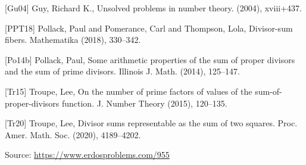 \documentclass{article}
\begin{document}
 [Gu04] Guy, Richard K., Unsolved problems in number theory. (2004), xviii+437.
 
 [PPT18] Pollack, Paul and Pomerance, Carl and Thompson, Lola, Divisor-sum fibers. Mathematika (2018), 330--342.
 
 [Po14b] Pollack, Paul, Some arithmetic properties of the sum of proper divisors and
the sum of prime divisors. Illinois J. Math. (2014), 125--147.
 
 [Tr15] Troupe, Lee, On the number of prime factors of values of the
sum-of-proper-divisors function. J. Number Theory (2015), 120--135.
 
 [Tr20] Troupe, Lee, Divisor sums representable as the sum of two squares. Proc. Amer. Math. Soc. (2020), 4189--4202.

\bigskip
\noindent\small{Source: \url{https://www.erdosproblems.com/955}}
\end{document}
